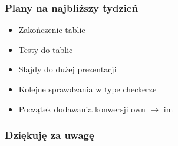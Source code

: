 \documentclass{beamer}
\begin{document}
	\begin{frame}
		\frametitle{Plany na najbliższy tydzień}
		\begin{itemize}
			\item Zakończenie tablic
			\item Testy do tablic
			\item Slajdy do dużej prezentacji
			\item Kolejne sprawdzania w type checkerze
			\item Początek dodawania konwersji own $\rightarrow$ im
		\end{itemize}
	\end{frame}

	\begin{frame}
	 \frametitle{Dziękuję za uwagę}
	\end{frame}
\end{document}
